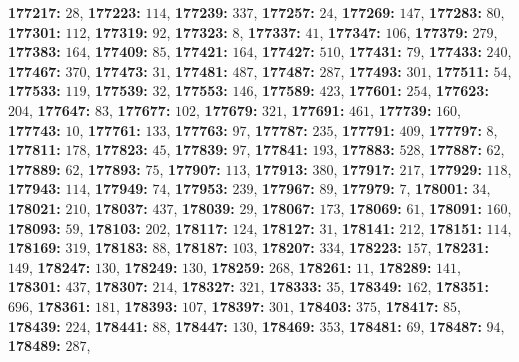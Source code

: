 \textsf{\bfseries 177217:} $28$, \textsf{\bfseries 177223:} $114$, \textsf{\bfseries 177239:} $337$, \textsf{\bfseries 177257:} $24$, \textsf{\bfseries 177269:} $147$, \textsf{\bfseries 177283:} $80$, \textsf{\bfseries 177301:} $112$, \textsf{\bfseries 177319:} $92$, \textsf{\bfseries 177323:} $8$, \textsf{\bfseries 177337:} $41$, \textsf{\bfseries 177347:} $106$, \textsf{\bfseries 177379:} $279$, \textsf{\bfseries 177383:} $164$, \textsf{\bfseries 177409:} $85$, \textsf{\bfseries 177421:} $164$, \textsf{\bfseries 177427:} $510$, \textsf{\bfseries 177431:} $79$, \textsf{\bfseries 177433:} $240$, \textsf{\bfseries 177467:} $370$, \textsf{\bfseries 177473:} $31$, \textsf{\bfseries 177481:} $487$, \textsf{\bfseries 177487:} $287$, \textsf{\bfseries 177493:} $301$, \textsf{\bfseries 177511:} $54$, \textsf{\bfseries 177533:} $119$, \textsf{\bfseries 177539:} $32$, \textsf{\bfseries 177553:} $146$, \textsf{\bfseries 177589:} $423$, \textsf{\bfseries 177601:} $254$, \textsf{\bfseries 177623:} $204$, \textsf{\bfseries 177647:} $83$, \textsf{\bfseries 177677:} $102$, \textsf{\bfseries 177679:} $321$, \textsf{\bfseries 177691:} $461$, \textsf{\bfseries 177739:} $160$, \textsf{\bfseries 177743:} $10$, \textsf{\bfseries 177761:} $133$, \textsf{\bfseries 177763:} $97$, \textsf{\bfseries 177787:} $235$, \textsf{\bfseries 177791:} $409$, \textsf{\bfseries 177797:} $8$, \textsf{\bfseries 177811:} $178$, \textsf{\bfseries 177823:} $45$, \textsf{\bfseries 177839:} $97$, \textsf{\bfseries 177841:} $193$, \textsf{\bfseries 177883:} $528$, \textsf{\bfseries 177887:} $62$, \textsf{\bfseries 177889:} $62$, \textsf{\bfseries 177893:} $75$, \textsf{\bfseries 177907:} $113$, \textsf{\bfseries 177913:} $380$, \textsf{\bfseries 177917:} $217$, \textsf{\bfseries 177929:} $118$, \textsf{\bfseries 177943:} $114$, \textsf{\bfseries 177949:} $74$, \textsf{\bfseries 177953:} $239$, \textsf{\bfseries 177967:} $89$, \textsf{\bfseries 177979:} $7$, \textsf{\bfseries 178001:} $34$, \textsf{\bfseries 178021:} $210$, \textsf{\bfseries 178037:} $437$, \textsf{\bfseries 178039:} $29$, \textsf{\bfseries 178067:} $173$, \textsf{\bfseries 178069:} $61$, \textsf{\bfseries 178091:} $160$, \textsf{\bfseries 178093:} $59$, \textsf{\bfseries 178103:} $202$, \textsf{\bfseries 178117:} $124$, \textsf{\bfseries 178127:} $31$, \textsf{\bfseries 178141:} $212$, \textsf{\bfseries 178151:} $114$, \textsf{\bfseries 178169:} $319$, \textsf{\bfseries 178183:} $88$, \textsf{\bfseries 178187:} $103$, \textsf{\bfseries 178207:} $334$, \textsf{\bfseries 178223:} $157$, \textsf{\bfseries 178231:} $149$, \textsf{\bfseries 178247:} $130$, \textsf{\bfseries 178249:} $130$, \textsf{\bfseries 178259:} $268$, \textsf{\bfseries 178261:} $11$, \textsf{\bfseries 178289:} $141$, \textsf{\bfseries 178301:} $437$, \textsf{\bfseries 178307:} $214$, \textsf{\bfseries 178327:} $321$, \textsf{\bfseries 178333:} $35$, \textsf{\bfseries 178349:} $162$, \textsf{\bfseries 178351:} $696$, \textsf{\bfseries 178361:} $181$, \textsf{\bfseries 178393:} $107$, \textsf{\bfseries 178397:} $301$, \textsf{\bfseries 178403:} $375$, \textsf{\bfseries 178417:} $85$, \textsf{\bfseries 178439:} $224$, \textsf{\bfseries 178441:} $88$, \textsf{\bfseries 178447:} $130$, \textsf{\bfseries 178469:} $353$, \textsf{\bfseries 178481:} $69$, \textsf{\bfseries 178487:} $94$, \textsf{\bfseries 178489:} $287$, 
